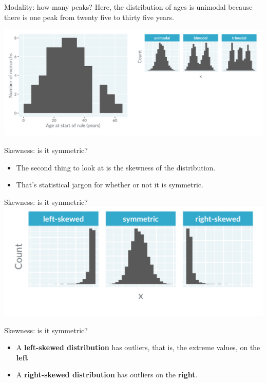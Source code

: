 \documentclass[
  ignorenonframetext,
]{beamer}
\begin{document}
\begin{frame}{Modality: how many peaks?}
\label{modality-how-many-peaks-3}
Here, the distribution of ages is unimodal because there is one peak
from twenty five to thirty five years.

\includegraphics{../images/im11.png}
\end{frame}

\begin{frame}{Skewness: is it symmetric?}
\label{skewness-is-it-symmetric}
\begin{itemize}
\item
  The second thing to look at is the skewness of the distribution.
\item
  That's statistical jargon for whether or not it is symmetric.
\end{itemize}
\end{frame}

\begin{frame}{Skewness: is it symmetric?}
\label{skewness-is-it-symmetric-1}
\includegraphics{../images/im12.png}
\end{frame}

\begin{frame}{Skewness: is it symmetric?}
\label{skewness-is-it-symmetric-2}
\begin{itemize}
\item
  A \textbf{left-skewed distribution} has outliers, that is, the extreme
  values, on the \textbf{left}
\item
  A \textbf{right-skewed distribution} has outliers on the
  \textbf{right}.
\end{itemize}
\end{frame}
\end{document}
